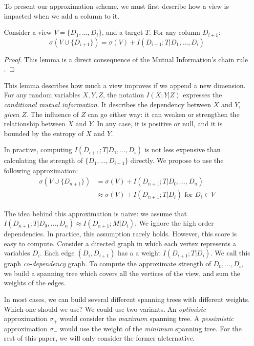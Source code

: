 To present our approximation scheme, we must first describe how a
view is impacted when we add a column to it.

\begin{lemma}\label{lem:chain}
Consider a view $V = \{D_1, \ldots, D_i\}$, and a target $T$.
For any column $D_{i+1}$: 
$$
\sigma(V \cup \{D_{i+1}\}) =  \sigma(V) + I(D_{i+1} ; T | D_1 , \ldots, D_i)
 $$
\end{lemma}
\begin{proof}
This lemma is a direct consequence of the Mutual Information's chain rule
\cite{cover2012elements}.
\end{proof}

This lemma describes how much a view improves if we append a new dimension.
For any random variables $X,Y,Z$, the notation $I(X;Y|Z)$ expresses the
\emph{conditional mutual information}. It describes the dependency between $X$
and $Y$, \emph{given $Z$}. The influence of $Z$ can go either way: it can
weaken or strengthen the relationship between $X$ and $Y$. In any case, it is
positive or null, and it is bounded by the entropy of $X$ and $Y$.

In practive, computing $ I(D_{i+1} ; T | D_1 , \ldots, D_i)$ is not less
expensive than calculating the strength of $\{D_1, \ldots, D_{i+1}\}$ directly.
We propose to use the following approximation:
\[
\begin{split}
    \sigma(V \cup \{D_{n+1}\}) & = \sigma(V)   + I(D_{n+1} ; T | D_0, \ldots, D_{n})\\
                           & \approx \sigma(V) + I(D_{n+1} ; T | D_{i})
\text{ for } D_i \in V
\end{split}
\]

The idea behind this approximation is naive: we assume that $I(D_{n+1} ; T |
D_0, \ldots, D_{n}) \approx I(D_{n+1} ; M | D_{i})$. We ignore the high order
dependencies. In practice, this assumption rarely holds.  However, this score
is easy to compute. Consider a directed graph in which each vertex represents a
variables $D_i$. Each edge $(D_i, D_{i+1})$ has a a weight $ I(D_{i+1} ; T |
D_{i})$.  We call this graph \emph{co-dependency} graph.  To compute the
approximate strength of ${D_0, \ldots, D_i}$, we build a spanning tree which
covers all the vertices of the view, and sum the weights of the edges.

In most cases, we can build several different spanning trees with different
weights. Which one should we use? We could use two variants. An
\emph{optimisic} approximation $\sigma_+ $ would consider the \emph{maximum}
spanning tree.  A \emph{pessimistic} approximation $\sigma_- $ would use the
weight of the \emph{minimum} spanning tree. For the rest of this paper, we will
only consider the former aleternative. 

